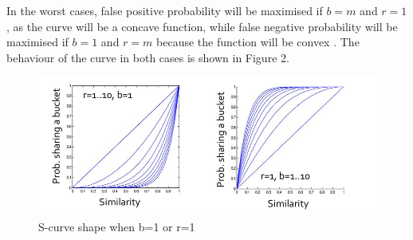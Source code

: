\documentclass[]{report}
\begin{document}
In the worst cases, false positive probability will be maximised if $b = m$ and $r = 1$, as the curve will be a concave function, while false negative probability will be maximised if $b = 1$ and $r = m$ because the function will be convex \cite{lsh}. The behaviour of the curve in both cases is shown in Figure 2. \\
\begin{figure}[h]
	\includegraphics[width=1\textwidth]{worstcases.png}
	\caption{S-curve shape when b=1 or r=1 \cite{image} }
\end{figure}\\
\clearpage
\end{document}
